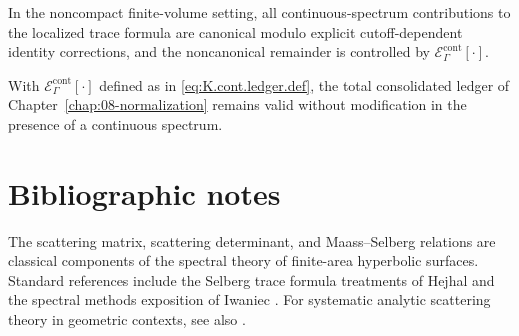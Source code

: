 \begin{corollary}
\label{cor:K.ledger.control}
In the noncompact finite-volume setting, all continuous-spectrum contributions to the localized trace formula are
canonical modulo explicit cutoff-dependent identity corrections, and the noncanonical remainder is controlled by
$\mathcal{E}^{\mathrm{cont}}_\Gamma[\cdot]$.
\end{corollary}

\begin{corollary}
\label{cor:K.consolidated}
With $\mathcal{E}^{\mathrm{cont}}_\Gamma[\cdot]$ defined as in \eqref{eq:K.cont.ledger.def}, the total consolidated
ledger of Chapter~\ref{chap:08-normalization} remains valid without modification in the presence of a continuous
spectrum.
\end{corollary}

\section*{Bibliographic notes}

The scattering matrix, scattering determinant, and Maass--Selberg relations are classical components of the spectral
theory of finite-area hyperbolic surfaces.  Standard references include the Selberg trace formula treatments of
Hejhal \cite{Hejhal1983} and the spectral methods exposition of Iwaniec \cite{Iwaniec2002}.  For systematic analytic
scattering theory in geometric contexts, see also \cite{DyatlovZworski2019}.

